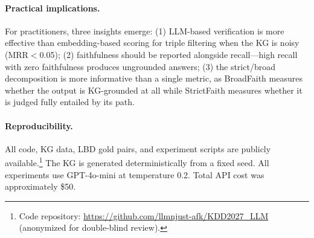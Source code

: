 \paragraph{Practical implications.}
For practitioners, three insights emerge: (1) LLM-based verification is more effective than embedding-based scoring for triple filtering when the KG is noisy (MRR$<$0.05); (2) faithfulness should be reported alongside recall---high recall with zero faithfulness produces ungrounded answers; (3) the strict/broad decomposition is more informative than a single metric, as BroadFaith measures whether the output is KG-grounded at all while StrictFaith measures whether it is judged fully entailed by its path.

\paragraph{Reproducibility.}
All code, KG data, LBD gold pairs, and experiment scripts are publicly available.\footnote{Code repository: \url{https://github.com/llmnjust-afk/KDD2027_LLM} (anonymized for double-blind review).} The KG is generated deterministically from a fixed seed. All experiments use GPT-4o-mini at temperature 0.2. Total API cost was approximately \$50.
